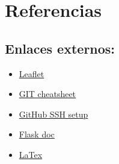 \section{Referencias}

\subsection{Enlaces externos:}

\begin{itemize}
    
\item \href{https://leafletjs.com/examples.html}{Leaflet}
\item \href{https://education.github.com/git-cheat-sheet-education.pdf}{GIT cheatsheet}
\item \href{https://docs.github.com/en/authentication/connecting-to-github-with-ssh}{GitHub SSH setup}
\item \href{https://flask.palletsprojects.com/en/3.0.x/}{Flask doc}
\item \href{https://www.overleaf.com/learn/latex/Learn_LaTeX_in_30_minutes}{LaTex}
\end{itemize}
